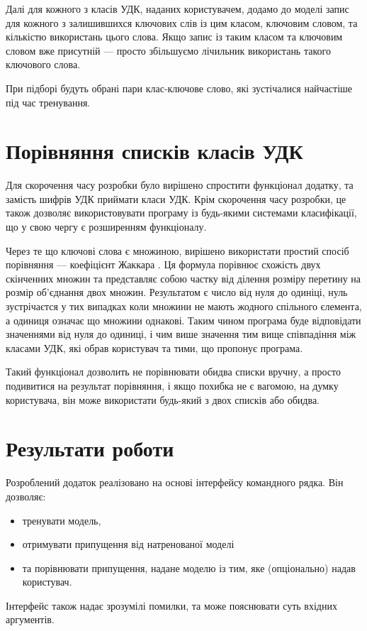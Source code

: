 \documentclass{article}
\let\oldsection\section
\renewcommand{\section}{\clearpage\oldsection}
\begin{document}
  Далі для кожного з класів УДК, наданих користувачем,
  додамо до моделі запис для кожного з залишившихся ключових слів із цим класом,
  ключовим словом, та кількістю використань цього слова.
  Якщо запис із таким класом та ключовим словом вже присутній ---
  просто збільшуємо лічильник використань такого ключового слова.

  При підборі будуть обрані пари клас-ключове слово,
  які зустічалися найчастіше під час тренування.

\section{Порівняння списків класів УДК}
Для скорочення часу розробки було вирішено спростити функціонал додатку,
  та замість шифрів УДК приймати класи УДК.
  Крім скорочення часу розробки, це також дозволяє використовувати програму
  із будь-якими системами класифікації,
  що у свою чергу є розширенням функціоналу.

  Через те що ключові слова є множиною, вирішено використати простий спосіб
  порівняння --- коефіцієнт Жаккара .
  Ця формула порівнює схожість двух скінченних множин та представляє собою
  частку від ділення розміру перетину 
  на розмір об'єднання  двох множин.
  Результатом є число від нуля до одиніці, нуль зустрічаєтся
  у тих випадках коли множини не мають жодного спільного єлемента,
  а одиниця означає що множини однакові.
  Таким чином програма буде відповідати значеннями від нуля до одиниці,
  і чим више значення тим вище співпадіння між класами УДК,
  які обрав користувач та тими, що пропонує програма.

  Такий функціонал дозволить не порівнювати обидва списки вручну,
  а просто подивитися на результат порівняння, і якщо похибка не є вагомою,
  на думку користувача, він може використати будь-який з двох списків або обидва.

\section{Результати роботи}
Розроблений додаток реалізовано на основі інтерфейсу командного рядка.
Він дозволяє:
\begin{itemize}
  \item тренувати модель,
  \item отримувати припущення від натренованої моделі
  \item та порівнювати припущення, надане моделю із тим, яке (опціонально) надав користувач.
\end{itemize}
Інтерфейс також надає зрозумілі помилки, та може пояснювати суть вхідних аргументів.
\end{document}
